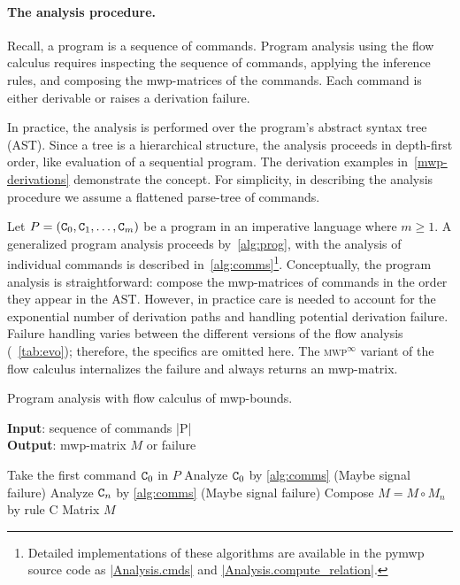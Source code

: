 \paragraph*{The analysis procedure.}
Recall, a program is a sequence of commands.
Program analysis using the flow calculus requires inspecting the sequence of commands,
applying the inference rules, and composing the mwp-matrices of the commands.
Each command is either derivable or raises a derivation failure.

In practice, the analysis is performed over the program's abstract syntax tree (AST).
Since a tree is a hierarchical structure, the analysis proceeds in depth-first order, like evaluation of a sequential program.
The derivation examples in~\autoref{mwp-derivations} demonstrate the concept.
For simplicity, in describing the analysis procedure we assume a flattened parse-tree of commands.

Let \(P = (\prm{C}_0,\prm{C}_1,\ldots,\prm{C}_m) \) be a program in an imperative language where \(m \geq 1\).
A generalized program analysis proceeds by~\autoref{alg:prog}, with the analysis of individual commands is described in~\autoref{alg:comms}\footnote{
    Detailed implementations of these algorithms are available in the pymwp source code as
    \href{https://github.com/statycc/pymwp/blob/40c9ceb644c734f15f82e63edc515716c4f35841/pymwp/analysis.py\#L118}
    {\pr|Analysis.cmds|} and
    \href{https://github.com/statycc/pymwp/blob/40c9ceb644c734f15f82e63edc515716c4f35841/pymwp/analysis.py\#L185}{\pr|Analysis.compute\_relation|}.}.
Conceptually, the program analysis is straightforward: compose the mwp-matrices of commands in the order they appear in the AST\@.
However, in practice care is needed to account for the exponential number of derivation paths
and handling potential derivation failure.
Failure handling varies between the different versions of the flow analysis (\cf~\autoref{tab:evo});
therefore, the specifics are omitted here.
The \textsc{mwp}\(^\infty\) variant of the flow calculus internalizes the failure and always returns an mwp-matrix.

\begin{algorithm}
\caption{Program analysis with flow calculus of mwp-bounds.}\label{alg:prog}
\textbf{Input}: sequence of commands \pr|P| \\
\textbf{Output}: mwp-matrix \(M\) or failure
\begin{algorithmic}[1]
\State Take the first command \(\prm{C}_0\) in \(P\)
\State Analyze \(\prm{C}_0\) by \autoref{alg:comms}
\State (Maybe signal failure)
\State Analyze \(\prm{C}_n\) by \autoref{alg:comms}
\State (Maybe signal failure)
\State Compose \(M = M \circ M_n \) by rule C
\EndFor
\State \Return Matrix \(M\) 
\end{algorithmic}
\end{algorithm}

